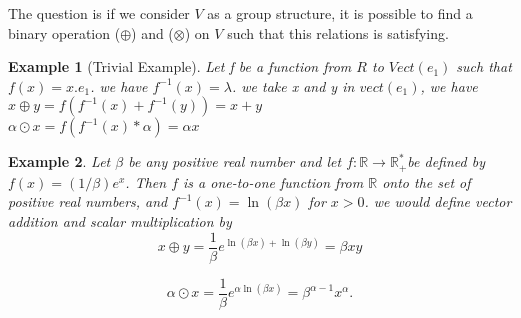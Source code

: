 \documentclass{article}
\newtheorem{Example}{Example}
\begin{document}
	The question is if we consider $V$ as a group 
    structure, it is possible to find a binary 
    operation ($\oplus$) and ($\otimes $) on $V$ 
    such that this relations is satisfying.
    \begin{Example}[Trivial Example]
        Let f be a function from $R$ to $Vect{(e_1)}$ such that $f(x) = x.e_1$.
        we have $f^{-1}(x) = \lambda$.
            we take x and y in $vect{(e_1)}$, we have \\
            $x\oplus y = f(f^{-1}(x) + f^{-1}(y)) = x + y$ \\
            $\alpha \odot x = f(f^{-1}(x) * \alpha) = \alpha x$ 
    \end{Example}
    \begin{Example}
        Let $\beta$ be any positive real number and let $f: \mathbb{R} \rightarrow \mathbb{R}_{+}^{*}$be
         defined by $f(x)=(1 / \beta) e^x$. Then $f$ is a one-to-one
          function from $\mathbb{R}$ onto the set of positive real numbers, 
          and $f^{-1}(x)=\ln (\beta x)$ for $x>0$. we would define vector 
          addition and scalar multiplication by
            $$
            x \oplus y=\frac{1}{\beta} e^{\ln (\beta x)+\ln (\beta y)}=\beta x y
            $$ 
            
            $$
            \alpha \odot x=\frac{1}{\beta} e^{\alpha \ln (\beta x)}=\beta^{\alpha-1} x^\alpha.
            $$ 
    \end{Example}
	
\end{document}
